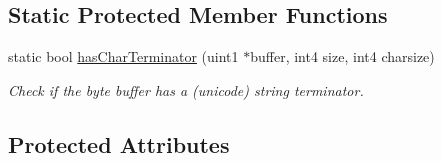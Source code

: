 \subsection*{Static Protected Member Functions}
\begin{DoxyCompactItemize}
\item 
static bool \mbox{\hyperlink{class_print_c_ab6cdf16ad9ffae9a6cb0a4f875aa092d}{has\+Char\+Terminator}} (uint1 $\ast$buffer, int4 size, int4 charsize)
\begin{DoxyCompactList}\small\item\em Check if the byte buffer has a (unicode) string terminator. \end{DoxyCompactList}\end{DoxyCompactItemize}
\subsection*{Protected Attributes}
